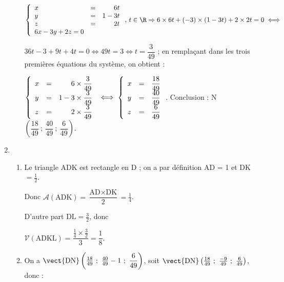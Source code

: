 \begin{enumerate}
\begin{enumerate}
		$\left\{\begin{array}{l c r}
x		&=&6t\\
y		&=&1-3t\\
z		&=&2t\\
6x - 3y + 2z = 0
\end{array}\right.,\, t \in \R \Rightarrow 6 \times 6t + (-3)\times (1 - 3t) + 2\times 2t = 0 \iff$

$36t - 3 + 9t + 4t = 0 \iff 49t = 3 \iff t = \dfrac{3}{49}$ ; en remplaçant dans les trois premières équations du système, on obtient :

\renewcommand\arraystretch{1.8}
$\left\{\begin{array}{l c r}
x		&=&6\times \dfrac{3}{49}\\
y		&=&1-3\times\dfrac{3}{49}\\
z		&=&2\times \dfrac{3}{49}
\end{array}\right. \iff \left\{\begin{array}{l c r}
x		&=&\dfrac{18}{49}\\
y		&=&\dfrac{40}{49}\\
z		&=&\dfrac{6}{49}
\end{array}\right.$.
\renewcommand\arraystretch{1}
Conclusion : N$\left(\dfrac{18}{49}~;~\dfrac{40}{49}~;~\dfrac{6}{49} \right)$.
	\end{enumerate}

%
%

\item %
	\begin{enumerate}
		\item Le triangle ADK est rectangle en D ; on a par définition AD = 1 et DK $=  \frac{1}{2}$.

Donc $\mathcal{A}(\text{ADK}) = \dfrac{\text{AD} \times \text{DK}}{2} = \frac{1}{4}$.

D'autre part $\text{DL} = \frac{3}{2}$, donc 

$\mathcal{V}(\text{ADKL}) = \dfrac{\frac{1}{4} \times \frac{3}{2}}{3} = \dfrac{1}{8}$.
		\item %
On a $\vect{\text{DN}}\left(\frac{18}{49}~;~\frac{40}{49} - 1~;~\dfrac{6}{49} \right)$, soit  $\vect{\text{DN}}\left(\frac{18}{49}~;~\frac{- 9}{49}~;~\frac{6}{49} \right)$, donc :


\end{enumerate}
\end{enumerate}
